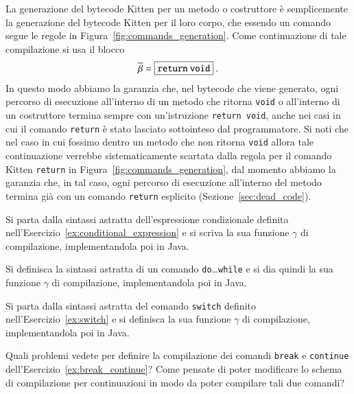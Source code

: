 La generazione del bytecode Kitten per un metodo o costruttore \`e
semplicemente la generazione del bytecode Kitten per
il loro corpo, che essendo un comando segue
le regole in Figura~\ref{fig:commands_generation}.
Come continuazione di tale compilazione si usa il blocco
\[
  \overline{\beta}=\fbox{$\mathtt{return\ void}$}~.
\]
In questo modo abbiamo la garanzia che, nel bytecode che viene generato,
ogni percorso di esecuzione
all'interno di un metodo che ritorna \texttt{void} o all'interno di un
costruttore termina sempre con un'istruzione \texttt{return\ void}, anche
nei casi in cui il comando \texttt{return} \`e stato lasciato
sottointeso dal programmatore. Si noti che nel caso in cui fossimo
dentro un metodo che non ritorna \texttt{void} allora tale continuazione
verrebbe sistematicamente scartata dalla regola per
il comando Kitten \texttt{return} in Figura~\ref{fig:commands_generation}, dal
momento abbiamo la garanzia che, in tal caso, ogni percorso di
esecuzione all'interno del metodo termina gi\`a con un comando
\texttt{return} esplicito (Sezione~\ref{sec:dead_code}).
%
\begin{exercise}\label{ex:conditional_expression_compilation}
Si parta dalla sintassi astratta dell'espressione condizionale definita
nell'Esercizio~\ref{ex:conditional_expression} e si scriva la sua
funzione $\gamma$ di compilazione, implementandola poi in Java.
\end{exercise}
%
\begin{exercise}\label{ex:do_while_compilation}
Si definisca la sintassi astratta di un comando
\texttt{do}\ldots\texttt{while} e si dia quindi la sua funzione $\gamma$
di compilazione, implementandola poi in Java.
\end{exercise}
%
\begin{exercise}\label{ex:switch_compilation}
Si parta dalla sintassi astratta del comando \texttt{switch} definito
nell'Esercizio~\ref{ex:switch} e si definisca la sua funzione $\gamma$ di
compilazione, implementandola poi in Java.
\end{exercise}
%
\begin{exercise}\label{ex:break_continue_continuation}
Quali problemi vedete per definire la compilazione dei comandi
\texttt{break} e \texttt{continue} dell'Esercizio~\ref{ex:break_continue}?
Come pensate di poter modificare lo schema di compilazione per
continuazioni in modo da poter compilare tali due comandi?
\end{exercise}
